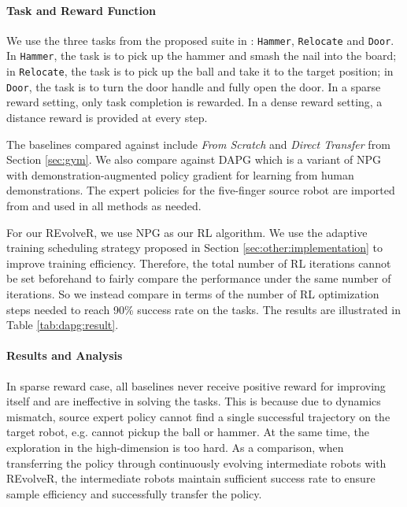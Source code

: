 \documentclass[nohyperref]{article}
\theoremstyle{plain}
\theoremstyle{definition}
\theoremstyle{remark}
\begin{document}
\paragraph{Task and Reward Function}

We use the three tasks from the proposed suite in \cite{dapg}: 
\texttt{Hammer}, \texttt{Relocate} and \texttt{Door}.
In \texttt{Hammer}, the task is to pick up the hammer and smash the nail into the board;
in \texttt{Relocate}, the task is to pick up the ball and take it to the target position;
in \texttt{Door}, the task is to turn the door handle and fully open the door.
In a sparse reward setting, only task completion is rewarded.
In a dense reward setting, a distance reward is provided at every step.


The baselines compared against include \textit{From Scratch} and \textit{Direct Transfer} from Section \ref{sec:gym}.
We also compare against DAPG \cite{dapg} which is a variant of NPG \cite{npg} with demonstration-augmented policy gradient for learning from human demonstrations.
The expert policies for the five-finger source robot are imported from \cite{dapg} and used in all methods as needed. 



For our REvolveR, we use NPG  \cite{npg} as our RL algorithm.
We use the adaptive training scheduling strategy proposed in Section \ref{sec:other:implementation} to improve training efficiency.
Therefore, the total number of RL iterations cannot be set beforehand to fairly compare the performance under the same number of iterations. 
So we instead compare in terms of the number of RL optimization steps needed to reach 90\% success rate on the tasks.
The results are illustrated in Table \ref{tab:dapg:result}. 



\paragraph{Results and Analysis}

In sparse reward case, all baselines never receive positive reward for improving itself and are ineffective in solving the tasks.
This is because due to dynamics mismatch, source expert policy cannot find a single successful trajectory on the target robot, e.g. cannot pickup the ball or hammer.
At the same time, the exploration in the high-dimension is too hard.
As a comparison, when transferring the policy through continuously evolving intermediate robots with REvolveR, the intermediate robots maintain sufficient success rate to ensure sample efficiency and successfully transfer the policy.
\end{document}
